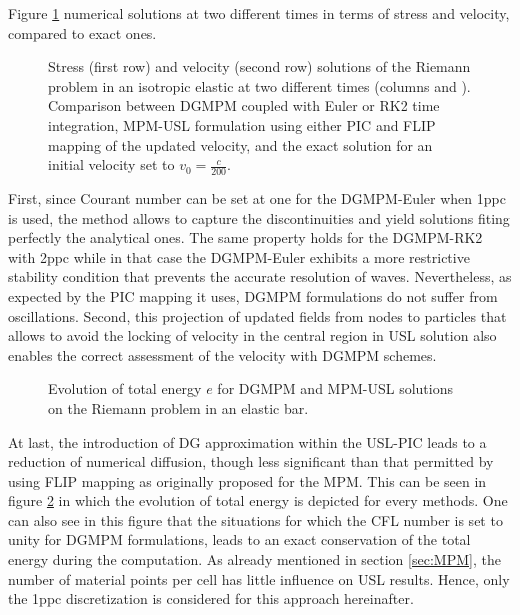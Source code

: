 Figure \ref{fig:elastic_stress} numerical solutions at two different times in terms of stress and velocity, compared to exact ones. 
\begin{figure}[h!]
  \centering
  { \label{subfig:rp_elastic1}}
  { \label{subfig:rp_elastic2}}
  
  \caption{Stress (first row) and velocity (second row) solutions of the Riemann problem in an isotropic elastic at two different times (columns  and ). Comparison between DGMPM coupled with Euler or RK2 time integration, MPM-USL formulation using either PIC and FLIP mapping of the updated velocity, and the exact solution for an initial velocity set to $v_0=\frac{c}{200}$.}
  \label{fig:elastic_stress}
\end{figure}
First, since Courant number can be set at one for the DGMPM-Euler when 1ppc is used, the method allows to capture the discontinuities and yield solutions fiting perfectly the analytical ones. The same property holds for the DGMPM-RK2 with 2ppc while in that case the DGMPM-Euler exhibits a more restrictive stability condition that prevents the accurate resolution of waves. Nevertheless, as expected by the PIC mapping it uses, DGMPM formulations do not suffer from oscillations. 
Second, this projection of updated fields from nodes to particles that allows to avoid the locking of velocity in the central region in USL solution also enables the correct assessment of the velocity with DGMPM schemes.
\begin{figure}[h!]
  \centering
  
  \caption{Evolution of total energy $e$ for DGMPM and MPM-USL solutions on the Riemann problem in an elastic bar.}
  \label{fig:energy_elastic_RP}
\end{figure}
At last, the introduction of DG approximation within the USL-PIC leads to a reduction of numerical diffusion, though less significant than that permitted by using FLIP mapping as originally proposed for the MPM. This can be seen in figure \ref{fig:energy_elastic_RP} in which the evolution of total energy is depicted for every methods.
One can also see in this figure that the situations for which the CFL number is set to unity for DGMPM formulations, leads to an exact conservation of the total energy during the computation.
As already mentioned in section \ref{sec:MPM}, the number of material points per cell has little influence on USL results. Hence, only the 1ppc discretization is considered for this approach hereinafter.
